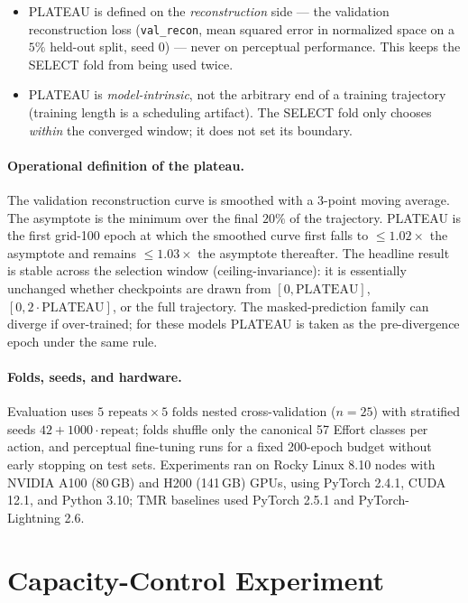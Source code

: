 \documentclass[letterpaper]{article} %
\begin{document}
\begin{itemize}[leftmargin=1.4em,itemsep=1pt]
\item PLATEAU is defined on the \emph{reconstruction} side --- the validation reconstruction loss
  (\texttt{val\_recon}, mean squared error in normalized space on a $5\%$ held-out split, seed $0$) ---
  never on perceptual performance. This keeps the SELECT fold from being used twice.
\item PLATEAU is \emph{model-intrinsic}, not the arbitrary end of a training trajectory (training
  length is a scheduling artifact). The SELECT fold only chooses \emph{within} the converged window;
  it does not set its boundary.
\end{itemize}

\paragraph{Operational definition of the plateau.}
The validation reconstruction curve is smoothed with a 3-point moving average. The asymptote is the
minimum over the final $20\%$ of the trajectory. PLATEAU is the first grid-100 epoch at which the
smoothed curve first falls to $\le 1.02\times$ the asymptote and remains $\le 1.03\times$ the asymptote
thereafter. The headline result is stable across the selection window (ceiling-invariance): it is
essentially unchanged whether checkpoints are drawn from $[0,\mathrm{PLATEAU}]$,
$[0,2\cdot\mathrm{PLATEAU}]$, or the full trajectory. The masked-prediction family can diverge if
over-trained; for these models PLATEAU is taken as the pre-divergence epoch under the same rule.

\paragraph{Folds, seeds, and hardware.}
Evaluation uses $5\text{ repeats}\times 5\text{ folds}$ nested cross-validation ($n=25$) with stratified
seeds $42 + 1000\cdot\text{repeat}$; folds shuffle only the canonical 57 Effort classes per action, and
perceptual fine-tuning runs for a fixed 200-epoch budget without early stopping on test sets.
Experiments ran on Rocky Linux 8.10 nodes with NVIDIA A100 (80\,GB) and H200 (141\,GB) GPUs, using
PyTorch 2.4.1, CUDA 12.1, and Python 3.10; TMR baselines used PyTorch 2.5.1 and PyTorch-Lightning 2.6.

\section{Capacity-Control Experiment}
\label{app:capacity}
\end{document}
